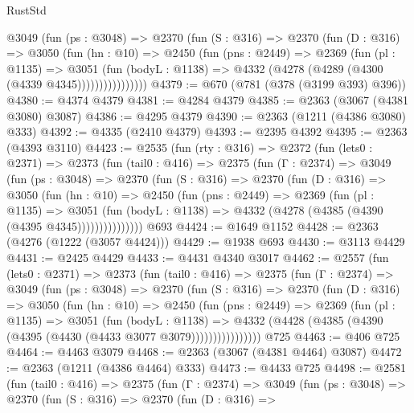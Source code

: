 \begin{lexlean}{RustStd}
\begin{coremodule}
            @3049
              (fun (ps : @3048) =>
              @2370
                (fun (S : @316) =>
                @2370
                  (fun (D : @316) =>
                  @3050
                    (fun (hn : @10) =>
                    @2450
                      (fun (pns : @2449) =>
                      @2369
                        (fun (pl : @1135) =>
                        @3051
                          (fun (bodyL : @1138) =>
                          @4332 (@4278 (@4289 (@4300 (@4339 @4345))))))))))))))))
@4379 := @670 (@781 (@378 (@3199 @393) @396))
@4380 := @4374 @4379
@4381 := @4284 @4379
@4385 := @2363 (@3067 (@4381 @3080) @3087)
@4386 := @4295 @4379
@4390 := @2363 (@1211 (@4386 @3080) @333)
@4392 := @4335 (@2410 @4379)
@4393 := @2395 @4392
@4395 := @2363 (@4393 @3110)
@4423 := @2535
    (fun (rty : @316) =>
    @2372
      (fun (lets0 : @2371) =>
      @2373
        (fun (tail0 : @416) =>
        @2375
          (fun (Γ : @2374) =>
          @3049
            (fun (ps : @3048) =>
            @2370
              (fun (S : @316) =>
              @2370
                (fun (D : @316) =>
                @3050
                  (fun (hn : @10) =>
                  @2450
                    (fun (pns : @2449) =>
                    @2369
                      (fun (pl : @1135) =>
                      @3051
                        (fun (bodyL : @1138) =>
                        @4332 (@4278 (@4385 (@4390 (@4395 @4345)))))))))))))))
    @693
@4424 := @1649 @1152
@4428 := @2363 (@4276 (@1222 (@3057 @4424)))
@4429 := @1938 @693
@4430 := @3113 @4429
@4431 := @2425 @4429
@4433 := @4431 @4340 @3017
@4462 := @2557
    (fun (lets0 : @2371) =>
    @2373
      (fun (tail0 : @416) =>
      @2375
        (fun (Γ : @2374) =>
        @3049
          (fun (ps : @3048) =>
          @2370
            (fun (S : @316) =>
            @2370
              (fun (D : @316) =>
              @3050
                (fun (hn : @10) =>
                @2450
                  (fun (pns : @2449) =>
                  @2369
                    (fun (pl : @1135) =>
                    @3051
                      (fun (bodyL : @1138) =>
                      @4332 (@4428 (@4385 (@4390 (@4395 (@4430 (@4433 @3077 @3079))))))))))))))))
    @725
@4463 := @406 @725
@4464 := @4463 @3079
@4468 := @2363 (@3067 (@4381 @4464) @3087)
@4472 := @2363 (@1211 (@4386 @4464) @333)
@4473 := @4433 @725
@4498 := @2581
    (fun (tail0 : @416) =>
    @2375
      (fun (Γ : @2374) =>
      @3049
        (fun (ps : @3048) =>
        @2370
          (fun (S : @316) =>
          @2370
            (fun (D : @316) =>

\end{coremodule}
\end{lexlean}
